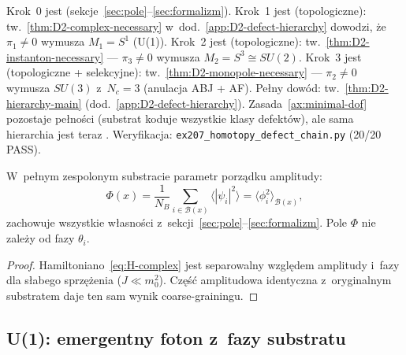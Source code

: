 \begin{uwaga}
\label{rem:hierarchy-status}
Krok~0 jest  (sekcje~\ref{sec:pole}--\ref{sec:formalizm}).
Krok~1 jest  (topologiczne):
tw.~\ref{thm:D2-complex-necessary} w~dod.~\ref{app:D2-defect-hierarchy}
dowodzi, \.ze $\pi_1 \neq 0$ wymusza $M_1 = S^1$ (U(1)).
Krok~2 jest  (topologiczne):
tw.~\ref{thm:D2-instanton-necessary} --- $\pi_3 \neq 0$
wymusza $M_2 = S^3 \cong SU(2)$.
Krok~3 jest  (topologiczne + selekcyjne):
tw.~\ref{thm:D2-monopole-necessary} --- $\pi_2 \neq 0$
wymusza $SU(3)$ z~$N_c = 3$ (anulacja ABJ + AF).
Pe\l{}ny dow\'od: tw.~\ref{thm:D2-hierarchy-main}
(dod.~\ref{app:D2-defect-hierarchy}).
Zasada~\ref{ax:minimal-dof} pozostaje 
pe\l{}no\'sci (substrat koduje wszystkie klasy defekt\'ow),
ale sama hierarchia jest teraz .
Weryfikacja: \texttt{ex207\_homotopy\_defect\_chain.py} (20/20 PASS).
\end{uwaga}


\begin{proposition}\label{prop:Phi-preserved}
W~pełnym zespolonym substracie parametr porządku amplitudy:
\begin{equation}\label{eq:Phi-from-amplitude}
    \Phi(x)
    = \frac{1}{N_B}\sum_{i \in \mathcal{B}(x)}
    \langle|\psi_i|^2\rangle
    = \langle\phi_i^2\rangle_{\mathcal{B}(x)},
\end{equation}
zachowuje wszystkie własności z~sekcji~\ref{sec:pole}--\ref{sec:formalizm}.
Pole $\Phi$ nie zależy od fazy $\theta_i$.
\end{proposition}

\begin{proof}
Hamiltoniano~\eqref{eq:H-complex} jest separowalny względem amplitudy
i~fazy dla słabego sprzężenia ($J \ll m_0^2$). Część amplitudowa
identyczna z~oryginalnym substratem daje ten sam wynik coarse-grainingu.
\end{proof}

\subsection{U(1): emergentny foton z~fazy substratu}%
\label{ssec:u1-photon}

